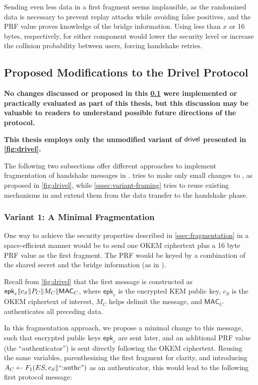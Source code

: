 Sending even less data in a first fragment seems implausible, as the randomized data is necessary to prevent replay attacks while avoiding false positives, and the PRF value proves knowledge of the bridge information. Using less than $x$ or 16 bytes, respectively, for either component would lower the security level or increase the collision probability between users, forcing handshake retries.

\subsection{Proposed Modifications to the Drivel Protocol} \label{ssec:drivel-mod}

\textbf{No changes discussed or proposed in this \cref{ssec:drivel-mod} were implemented or practically evaluated as part of this thesis, but this discussion may be valuable to readers to understand possible future directions of the protocol.}

\textbf{This thesis employs only the unmodified variant of $\textsf{drivel}{}$ presented in \cref{fig:drivel}.}

The following two subsections offer different approaches to implement fragmentation of handshake messages in \drivel{}.  tries to make only small changes to \drivel{}, as proposed in \cref{fig:drivel}, while \cref{sssec:variant-framing} tries to reuse existing mechanisms in \obfsfour{} and extend them from the data transfer to the handshake phase.

\subsubsection{Variant 1: A Minimal Fragmentation} \label{sssec:variant-minimal}

One way to achieve the security properties described in \cref{ssec:fragmentation} in a space-efficient manner would be to send one OKEM ciphertext plus a 16 byte PRF value as the first fragment. The PRF would be keyed by a combination of the shared secret and the bridge information (as in \drivel{}).

Recall from \cref{fig:drivel} that the first \drivel{} message is constructed as $\mathsf{epk}_e \| c_S \| P_C \| M_C \| \mathsf{MAC}_C$, where $\mathsf{epk}_e$ is the encrypted KEM public key, $c_S$ is the OKEM ciphertext of interest, $M_C$ helps delimit the message, and $\mathsf{MAC}_C$ authenticates all preceding data.

In this fragmentation approach, we propose a minimal change to this message, such that encrypted public keys $\mathsf{epk}_e$ are sent later, and an additional PRF value (the ``authenticator'') is sent directly following the OKEM ciphertext. Reusing the same variables, parenthesizing the first fragment for clarity, and introducing $A_C \gets F_1(ES, c_S \| \text{``:authc''})$ as an authenticator, this would lead to the following first protocol message:

